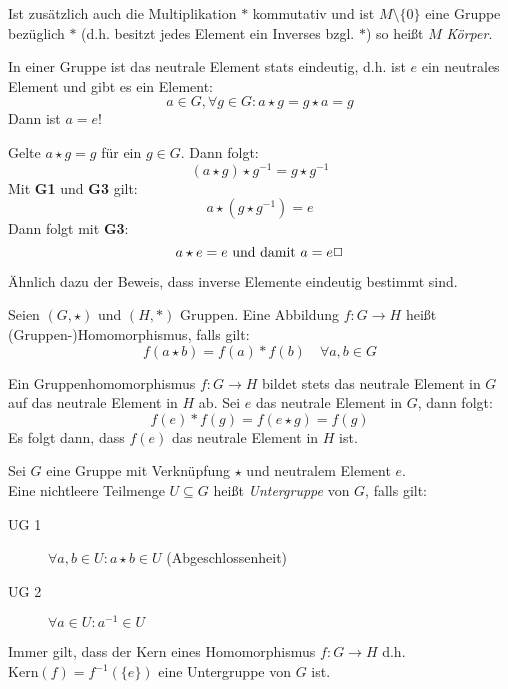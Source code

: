 \vspace{1em}
Ist zusätzlich auch die Multiplikation $*$ kommutativ und ist $M\setminus\{0\}$ eine Gruppe bezüglich $*$ (d.h. besitzt jedes Element ein Inverses bzgl. $*$) so heißt $M$ \emph{Körper}.

In einer Gruppe ist das neutrale Element stats eindeutig, d.h. ist $e$ ein neutrales Element und gibt es ein Element:
\begin{equation*}
  a\in G, \forall g\in G : a\star g = g\star a = g
\end{equation*}
Dann ist $a = e$!

\beweis
Gelte $a\star g = g$ für ein $g\in G$. Dann folgt:
\begin{equation*}
  (a\star g)\star g^{-1}=g\star g^{-1}
\end{equation*}
Mit \textbf{G1} und \textbf{G3} gilt:
\begin{equation*}
  a\star (g\star g^{-1})=e
\end{equation*}
Dann folgt mit \textbf{G3}:
\begin{equation*}
  a\star e=e \text{ und damit } a=e \hfill\Box
\end{equation*}

\bemerkung
Ähnlich dazu der Beweis, dass inverse Elemente eindeutig bestimmt sind.


Seien $(G,\star)$ und $(H,\ast)$ Gruppen. Eine Abbildung $f:G\rightarrow H$ heißt (Gruppen-)Homomorphismus, falls gilt:
\begin{equation*}
  f(a\star b)=f(a)\ast f(b)\quad\forall a,b\in G
\end{equation*}

\lemma{}
Ein Gruppenhomomorphismus $f:G\rightarrow H$ bildet stets das neutrale Element in $G$ auf das neutrale Element in $H$ ab.
\beweis
Sei $e$ das neutrale Element in $G$, dann folgt:
\begin{equation*}
  f(e)\ast f(g)=f(e\star g)=f(g)
\end{equation*}
Es folgt dann, dass $f(e)$ das neutrale Element in $H$ ist.


Sei $G$ eine Gruppe mit Verknüpfung $\star$ und neutralem Element $e$.\\
Eine nichtleere Teilmenge $U\subseteq G$ heißt \emph{Untergruppe} von $G$, falls gilt:
\begin{description}
  \item[UG 1] $\forall a,b\in U : a\star b\in U$ (Abgeschlossenheit)
  \item[UG 2] $\forall a\in U : a^{-1}\in U$
\end{description}

Immer gilt, dass der Kern eines Homomorphismus $f:G \rightarrow H$ d.h. $\mathrm{Kern}(f)=f^{-1}(\{e\})$  eine Untergruppe von $G$ ist.
